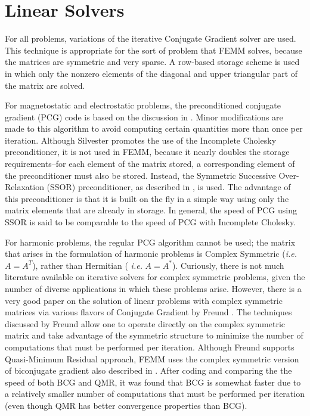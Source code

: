 \documentclass[12pt]{report}
\begin{document}
\section{Linear Solvers}

For all problems, variations of the iterative Conjugate Gradient
solver are used.  This technique is appropriate for the sort of
problem that FEMM solves, because the matrices are symmetric and
very sparse.  A row-based storage scheme is used in which only the
nonzero elements of the diagonal and upper triangular part of the
matrix are solved.

For magnetostatic and electrostatic problems, the preconditioned
conjugate gradient (PCG) code is based on the discussion in
\cite{silv}. Minor modifications are made to this algorithm to
avoid computing certain quantities more than once per iteration.
Although Silvester promotes the use of the Incomplete Cholesky
preconditioner, it is not used in FEMM, because it nearly doubles
the storage requirements--for each element of the matrix stored, a
corresponding element of the preconditioner must also be stored.
Instead, the Symmetric Successive Over-Relaxation (SSOR)
preconditioner, as described in \cite{fletcher}, is used. The
advantage of this preconditioner is that it is built on the fly in
a simple way using only the matrix elements that are already in
storage. In general, the speed of PCG using SSOR is said to be
comparable to the speed of PCG with Incomplete Cholesky.

For harmonic problems, the regular PCG algorithm cannot be used;
the matrix that arises in the formulation of harmonic problems is
Complex Symmetric ({\em i.e.} $A=A^T$), rather than Hermitian ({\em
i.e.} $A=A^*$). Curiously, there is not much literature available
on iterative solvers for complex symmetric problems, given the
number of diverse applications in which these problems arise.
However, there is a very good paper on the solution of linear
problems with complex symmetric matrices via various flavors of
Conjugate Gradient by Freund \cite{freund}. The techniques
discussed by Freund allow one to operate directly on the complex
symmetric matrix and take advantage of the symmetric structure to
minimize the number of computations that must be performed per
iteration. Although Freund supports Quasi-Minimum Residual
approach, FEMM uses the complex symmetric version of biconjugate
gradient also described in \cite{freund}. After coding and
comparing the the speed of both BCG and QMR, it was found that BCG
is somewhat faster due to a relatively smaller number of
computations that must be performed per iteration (even though QMR
has better convergence properties than BCG).
\end{document}
